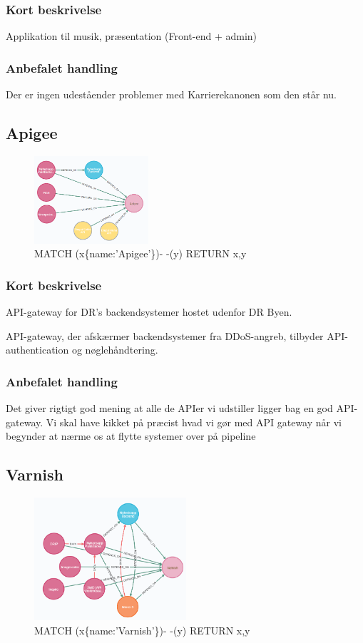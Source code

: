 \documentclass{article}
\begin{document}
\subsubsection*{Kort beskrivelse}
Applikation til musik, præsentation (Front-end + admin)
\subsubsection*{Anbefalet handling}
Der er ingen udeståender problemer med Karrierekanonen som den står nu.


\subsection{Apigee}
\begin{figure}[h]
\includegraphics[width=120pt]{Apigee.PNG}
\caption{MATCH (x\{name:'Apigee'\})- -(y) RETURN x,y}
\end{figure}
\subsubsection*{Kort beskrivelse}
API-gateway for DR's backendsystemer hostet udenfor DR Byen.

API-gateway, der afskærmer backendsystemer fra DDoS-angreb, tilbyder API-authentication og nøglehåndtering.
\subsubsection*{Anbefalet handling}
Det giver rigtigt god mening at alle de APIer vi udstiller ligger bag en god API-gateway. Vi skal have kikket på præcist hvad vi gør med API gateway når vi begynder at nærme os at flytte systemer over på pipeline


\subsection{Varnish}
\begin{figure}[h]
\includegraphics[width=160pt]{Varnish.PNG}
\caption{MATCH (x\{name:'Varnish'\})- -(y) RETURN x,y}
\end{figure}
\end{document}
